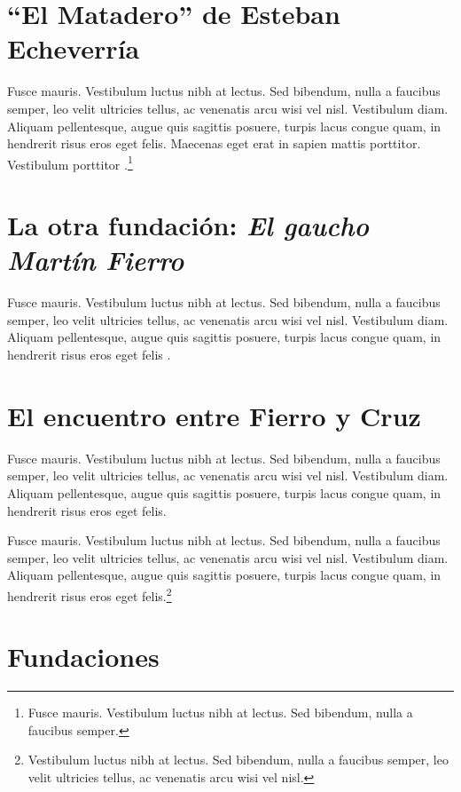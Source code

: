 \section{\enquote{El Matadero} de Esteban Echeverría}

Fusce mauris. Vestibulum luctus nibh at lectus. Sed bibendum, nulla a faucibus semper, leo velit ultricies tellus, ac venenatis arcu wisi vel nisl. Vestibulum diam. Aliquam pellentesque, augue quis sagittis posuere, turpis lacus congue quam, in hendrerit risus eros eget felis. Maecenas eget erat in sapien mattis porttitor. Vestibulum porttitor \parencite{@3190-QUIROGA2016}.\footnote{Fusce mauris. Vestibulum luctus nibh at lectus. Sed bibendum, nulla a faucibus semper.}

\section{La otra fundación: \emph{El gaucho Martín Fierro}}

Fusce mauris. Vestibulum luctus nibh at lectus. Sed bibendum, nulla a faucibus semper, leo velit ultricies tellus, ac venenatis arcu wisi vel nisl. Vestibulum diam. Aliquam pellentesque, augue quis sagittis posuere, turpis lacus congue quam, in hendrerit risus eros eget felis \parencite{@3188-SHELLY2023}.

\section{El encuentro entre Fierro y Cruz}

Fusce mauris. Vestibulum luctus nibh at lectus. Sed bibendum, nulla a faucibus semper, leo velit ultricies tellus, ac venenatis arcu wisi vel nisl. Vestibulum diam. Aliquam pellentesque, augue quis sagittis posuere, turpis lacus congue quam, in hendrerit risus eros eget felis.

Fusce mauris. Vestibulum luctus nibh at lectus. Sed bibendum, nulla a faucibus semper, leo velit ultricies tellus, ac venenatis arcu wisi vel nisl. Vestibulum diam. Aliquam pellentesque, augue quis sagittis posuere, turpis lacus congue quam, in hendrerit risus eros eget felis.\footnote{Vestibulum luctus nibh at lectus. Sed bibendum, nulla a faucibus semper, leo velit ultricies tellus, ac venenatis arcu wisi vel nisl.}

\section{Fundaciones}

